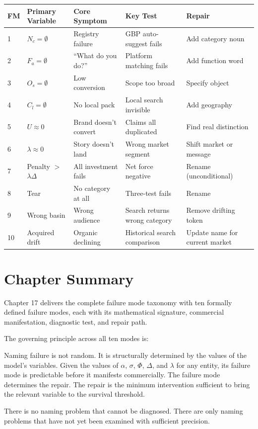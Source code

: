 \documentclass[12pt, openany]{book}
\theoremstyle{thmstyle}
\theoremstyle{defstyle}
\begin{document}
\begin{center}
\begin{tabular}{lllll}
\toprule
\textbf{FM} & \textbf{Primary Variable} & \textbf{Core Symptom} & \textbf{Key Test} & \textbf{Repair} \\
\midrule
1 & $N_c = \emptyset$ & Registry failure & GBP auto-suggest fails & Add category noun \\
2 & $F_a = \emptyset$ & ``What do you do?'' & Platform matching fails & Add function word \\
3 & $O_s = \emptyset$ & Low conversion & Scope too broad & Specify object \\
4 & $C_l = \emptyset$ & No local pack & Local search invisible & Add geography \\
5 & $U \approx 0$ & Brand doesn't convert & Claims all duplicated & Find real distinction \\
6 & $\lambda \approx 0$ & Story doesn't land & Wrong market segment & Shift market or message \\
7 & Penalty $>$ $\lambda\Delta$ & All investment fails & Net force negative & Rename (unconditional) \\
8 & Tear & No category at all & Three-test fails & Rename \\
9 & Wrong basin & Wrong audience & Search returns wrong category & Remove drifting token \\
10 & Acquired drift & Organic declining & Historical search comparison & Update name for current market \\
\bottomrule
\end{tabular}
\end{center}

\section{Chapter Summary}

Chapter 17 delivers the complete failure mode taxonomy with ten formally defined failure modes, each with its mathematical signature, commercial manifestation, diagnostic test, and repair path.

The governing principle across all ten modes is:

\begin{keybox}
Naming failure is not random. It is structurally determined by the values of the model's variables. Given the values of $\alpha$, $\sigma$, $\Phi$, $\Delta$, and $\lambda$ for any entity, its failure mode is predictable before it manifests commercially. The failure mode determines the repair. The repair is the minimum intervention sufficient to bring the relevant variable to the survival threshold.

There is no naming problem that cannot be diagnosed. There are only naming problems that have not yet been examined with sufficient precision.
\end{keybox}
\end{document}
